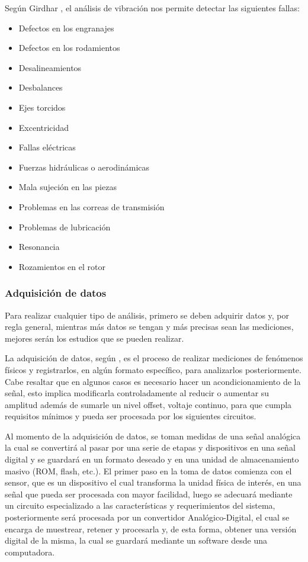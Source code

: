 Según Girdhar \textcite{Girdhar},  el análisis de vibración nos permite detectar las
siguientes fallas:

\begin{itemize}[noitemsep]

\item Defectos en los engranajes
\item Defectos en los rodamientos
\item Desalineamientos
\item Desbalances
\item Ejes torcidos
\item Excentricidad
\item Fallas eléctricas
\item Fuerzas hidráulicas o aerodinámicas
\item Mala sujeción en las piezas
\item Problemas en las correas de transmisión
\item Problemas de lubricación
\item Resonancia
\item Rozamientos en el rotor
\end{itemize}


\subsubsection*{Adquisición de datos}

Para realizar cualquier tipo de análisis, primero se deben adquirir datos y,
por regla general, mientras más datos se tengan y más precisas sean las
mediciones, mejores serán los estudios que se pueden realizar.


La adquisición de datos, según \textcite{adquisiciondatos}, es el proceso de
realizar mediciones de fenómenos físicos
y registrarlos, en algún formato específico, para analizarlos posteriormente.
Cabe resaltar que en algunos casos es necesario hacer un acondicionamiento de
la señal, esto
implica modificarla controladamente al reducir o aumentar su amplitud además de
sumarle un nivel offset, voltaje continuo, para que cumpla requisitos mínimos
y pueda ser procesada por los siguientes circuitos.

Al momento de la adquisición de datos, se toman medidas de una señal analógica
la cual se convertirá al pasar por una serie de etapas y dispositivos en una
señal digital y se guardará en un formato deseado y en una unidad de
almacenamiento masivo (ROM, flash, etc.).
El primer paso en la toma de  datos comienza con el sensor, que es un
dispositivo el cual transforma la unidad física de interés, en una señal que
pueda ser procesada con mayor facilidad, luego se adecuará mediante un
circuito especializado a las características y requerimientos del sistema,
posteriormente será procesada por un convertidor Analógico-Digital, el cual se encarga de
muestrear, retener y procesarla  y, de esta forma, obtener una versión
digital de la misma, la cual se  guardará mediante un software desde
una computadora.

